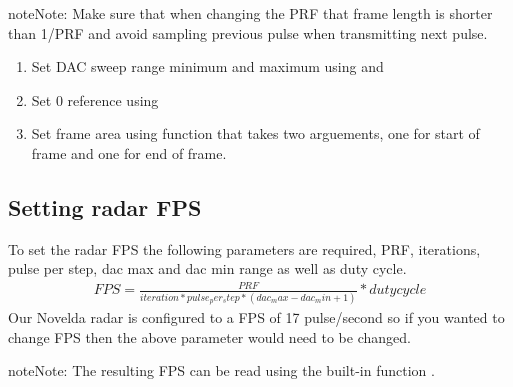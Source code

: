 \documentclass[letterpaper,10pt,english]{sphinxmanual}
\begin{document}
\begin{sphinxadmonition}{note}{Note:}
Make sure that when changing the PRF that frame length is shorter than 1/PRF and avoid sampling previous pulse when transmitting next pulse.
\end{sphinxadmonition}
\begin{enumerate}
\def\theenumi{\arabic{enumi}}
\def\labelenumi{\theenumi .}
\makeatletter\def\p@enumii{\p@enumi \theenumi .}\makeatother
\setcounter{enumi}{2}
\item {} 
Set DAC sweep range minimum and maximum using  and 

\item {} 
Set 0 reference using 

\item {} 
Set frame area using function  that takes two arguements, one for start of frame and one for end of frame.

\end{enumerate}


\subsection{Setting radar FPS}
\label{\detokenize{Radar information:setting-radar-fps}}
To set the radar FPS the following parameters are required, PRF, iterations, pulse per step, dac max and dac min range as well as duty cycle.
\begin{equation*}
\begin{split}FPS = \frac{PRF}{iteration*pulse_per_step*(dac_max-dac_min+1)} * duty cycle\end{split}
\end{equation*}
Our Novelda radar is configured to a FPS of 17 pulse/second so if you wanted to change FPS then the above parameter would need to be changed.

\begin{sphinxadmonition}{note}{Note:}
The resulting FPS can be read using the built-in function .
\end{sphinxadmonition}
\end{document}
